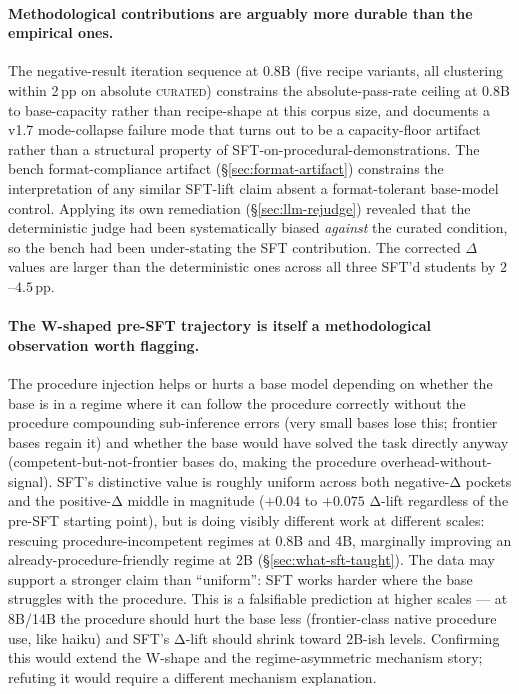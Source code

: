 \documentclass[10pt]{article}
\newcommand{\CU}{\textsc{curated}\xspace}
\begin{document}
\paragraph{Methodological contributions are arguably more durable than the empirical ones.} The negative-result iteration sequence at 0.8B (five recipe variants, all clustering within 2\,pp on absolute \CU{}) constrains the absolute-pass-rate ceiling at 0.8B to base-capacity rather than recipe-shape at this corpus size, and documents a v1.7 mode-collapse failure mode that turns out to be a capacity-floor artifact rather than a structural property of SFT-on-procedural-demonstrations. The bench format-compliance artifact (\S\ref{sec:format-artifact}) constrains the interpretation of any similar SFT-lift claim absent a format-tolerant base-model control. Applying its own remediation (\S\ref{sec:llm-rejudge}) revealed that the deterministic judge had been systematically biased \emph{against} the curated condition, so the bench had been under-stating the SFT contribution. The corrected $\Delta$ values are larger than the deterministic ones across all three SFT'd students by $2$--$4.5$\,pp.

\paragraph{The W-shaped pre-SFT trajectory is itself a methodological observation worth flagging.} The procedure injection helps or hurts a base model depending on whether the base is in a regime where it can follow the procedure correctly without the procedure compounding sub-inference errors (very small bases lose this; frontier bases regain it) and whether the base would have solved the task directly anyway (competent-but-not-frontier bases do, making the procedure overhead-without-signal). SFT's distinctive value is roughly uniform across both negative-Δ pockets and the positive-Δ middle in magnitude ($+0.04$ to $+0.075$ Δ-lift regardless of the pre-SFT starting point), but is doing visibly different work at different scales: rescuing procedure-incompetent regimes at 0.8B and 4B, marginally improving an already-procedure-friendly regime at 2B (\S\ref{sec:what-sft-taught}). The data may support a stronger claim than ``uniform'': SFT works harder where the base struggles with the procedure. This is a falsifiable prediction at higher scales --- at 8B/14B the procedure should hurt the base less (frontier-class native procedure use, like haiku) and SFT's Δ-lift should shrink toward 2B-ish levels. Confirming this would extend the W-shape and the regime-asymmetric mechanism story; refuting it would require a different mechanism explanation.
\end{document}
